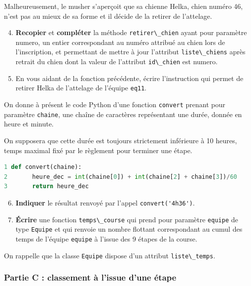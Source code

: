 Malheureusement, le musher s'aperçoit que sa chienne Helka, chien numéro
46, n'est pas au mieux de sa forme et il décide de la retirer de
l'attelage.

\begin{enumerate}
\setcounter{enumi}{3}
\item
  \textbf{Recopier} et \textbf{compléter} la méthode
  \passthrough{\lstinline!retirer\_chien!} ayant pour paramètre numero,
  un entier correspondant au numéro attribué au chien lors de
  l'inscription, et permettant de mettre à jour l'attribut
  \passthrough{\lstinline!liste\_chiens!} après retrait du chien dont la
  valeur de l'attribut \passthrough{\lstinline!id\_chien!} est numero.
\item
  En vous aidant de la fonction précédente, écrire l'instruction qui
  permet de retirer Helka de l'attelage de l'équipe
  \passthrough{\lstinline!eq11!}.
\end{enumerate}

On donne à présent le code Python d'une fonction
\passthrough{\lstinline!convert!} prenant pour paramètre
\passthrough{\lstinline!chaine!}, une chaîne de caractères représentant
une durée, donnée en heure et minute.

On supposera que cette durée est toujours strictement inférieure à 10
heures, temps maximal fixé par le règlement pour terminer une étape.

\begin{lstlisting}[language=Python]
1 def convert(chaine):
2       heure_dec = int(chaine[0]) + int(chaine[2] + chaine[3])/60
3       return heure_dec
\end{lstlisting}

\begin{enumerate}
\setcounter{enumi}{5}
\item
  \textbf{Indiquer} le résultat renvoyé par l'appel
  \passthrough{\lstinline!convert('4h36')!}.
\item
  \textbf{Écrire} une fonction \passthrough{\lstinline!temps\_course!}
  qui prend pour paramètre \passthrough{\lstinline!equipe!} de type
  \passthrough{\lstinline!Equipe!} et qui renvoie un nombre flottant
  correspondant au cumul des temps de l'équipe
  \passthrough{\lstinline!equipe!} à l'issue des 9 étapes de la course.
\end{enumerate}

On rappelle que la classe \passthrough{\lstinline!Equipe!} dispose d'un
attribut \passthrough{\lstinline!liste\_temps!}.

\subsubsection{Partie C : classement à l'issue d'une
étape}\label{partie-c-classement-uxe0-lissue-dune-uxe9tape}

